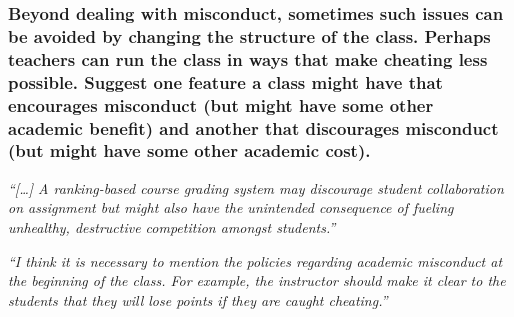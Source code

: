 \documentclass[12pt]{beamer}
\newcommand\ans[1]{{\it ``#1''}}
\begin{document}
\begin{frame}   %

\frametitle{ Beyond dealing with misconduct, sometimes such issues can be avoided by changing the structure of the class. Perhaps teachers can run the class in ways that make cheating less possible.  Suggest one feature a class might have that encourages misconduct (but might have some other academic benefit) and another that discourages misconduct (but might have some other academic cost).}

\ans{[\dots]  A ranking-based course grading system may discourage student collaboration on assignment but might also  have  the  unintended  consequence  of  fueling  unhealthy,  destructive  competition amongst students.}




\end{frame}

\begin{frame}

\ans{I think it is necessary to mention the policies regarding academic misconduct at the beginning of the class.  For example,  the instructor should make it clear to the students  that  they  will  lose  points  if  they  are  caught  cheating.}

\end{frame}
\end{document}
